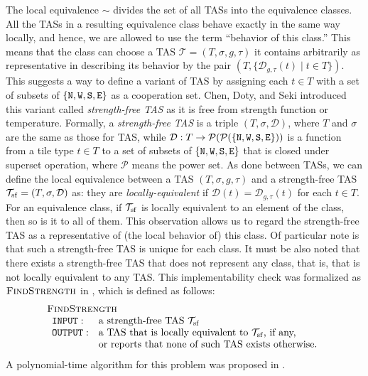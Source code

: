 \documentclass{article}
\theoremstyle{remark}
\theoremstyle{definition}
\newcommand{\tas}{\ensuremath{\mathcal{T}}}
\newcommand{\findstrength}{\ensuremath{\mbox{\sc FindStrength}}}
\newcommand{\north}{{\tt N}}
\newcommand{\west}{{\tt W}}
\newcommand{\south}{{\tt S}}
\newcommand{\east}{{\tt E}}
\begin{document}
The local equivalence $\sim$ divides the set of all TASs into the equivalence classes. 
All the TASs in a resulting equivalence class behave exactly in the same way locally, and hence, we are allowed to use the term ``behavior of this class.'' 
This means that the class can choose a TAS $\tas = (T, \sigma, g, \tau)$ it contains arbitrarily as representative in describing its behavior by the pair $(T, \{\mathcal{D}_{g, \tau}(t) \mid t \in T\})$. 
This suggests a way to define a variant of TAS by assigning each $t \in T$ with a set of subsets of $\{\north, \west, \south, \east\}$ as a cooperation set. 
Chen, Doty, and Seki introduced this variant called {\it strength-free TAS} \cite{ChenDotySeki2011} as it is free from strength function or temperature. 
Formally, a {\it strength-free TAS} is a triple $(T, \sigma, \mathcal{D})$, where $T$ and $\sigma$ are the same as those for TAS, while $\mathcal{D}: T \to \mathcal{P}(\mathcal{P}(\{\north, \west, \south, \east\}))$ is a function from a tile type $t \in T$ to a set of subsets of $\{\north, \west, \south, \east\}$ that is closed under superset operation, where $\mathcal{P}$ means the power set. 
As done between TASs, we can define the local equivalence between a TAS $(T, \sigma, g, \tau)$ and a strength-free TAS $\tas_{\rm sf} = (T, \sigma, \mathcal{D})$ as: they are {\it locally-equivalent} if $\mathcal{D}(t) = \mathcal{D}_{g, \tau}(t)$ for each $t \in T$. 
For an equivalence class, if $\tas_{\rm sf}$ is locally equivalent to an element of the class, then so is it to all of them. 
This observation allows us to regard the strength-free TAS as a representative of (the local behavior of) this class. 
Of particular note is that such a strength-free TAS is unique for each class. 
It must be also noted that there exists a strength-free TAS that does not represent any class, that is, that is not locally equivalent to any TAS. 
This implementability check was formalized as $\findstrength$ in \cite{ChenDotySeki2011}, which is defined as follows:
\[
\begin{array}{l}
\findstrength \\
\begin{array}{ll}
{\tt INPUT:}  	& \mbox{a strength-free TAS $\tas_{\rm sf}$} \\
{\tt OUTPUT:} 	& \mbox{a TAS that is locally equivalent to $\tas_{\rm sf}$, if any,}\\  
		& \mbox{or reports that none of such TAS exists otherwise}. 
\end{array}
\end{array}
\]
A polynomial-time algorithm for this problem was proposed in \cite{ChenDotySeki2011}. 
\end{document}
